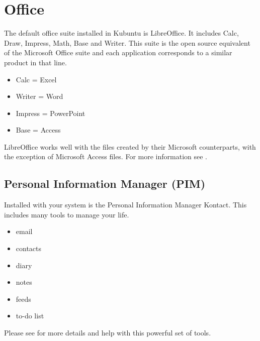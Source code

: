 \documentclass[letterpaper,10pt,english]{sphinxmanual}
\begin{document}
\section{Office}
\label{\detokenize{docs/software:office}}
The default office suite installed in Kubuntu is LibreOffice. It includes Calc, Draw, Impress, Math, Base and Writer. This suite is the open source equivalent of the Microsoft Office suite and each application corresponds to a similar product in that line.
\begin{itemize}
\item {} 
Calc = Excel

\item {} 
Writer = Word

\item {} 
Impress = PowerPoint

\item {} 
Base = Access

\end{itemize}

LibreOffice works well with the files created by their Microsoft counterparts, with the exception of Microsoft Access files. For more information see .


\subsection{Personal Information Manager (PIM)}
\label{\detokenize{docs/software:personal-information-manager-pim}}
Installed with your system is the  Personal Information Manager Kontact. This includes many tools to manage your life.
\begin{itemize}
\item {} 
email

\item {} 
contacts

\item {} 
diary

\item {} 
notes

\item {} 
feeds

\item {} 
to-do list

\end{itemize}

Please see  for more details and help with this powerful set of tools.
\end{document}
